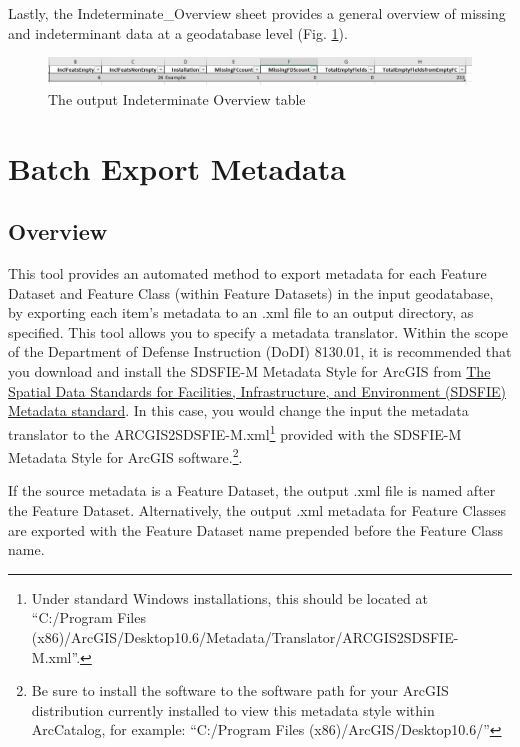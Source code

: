 \documentclass[openany]{book}
\let\rmarkdownfootnote\footnote%
\def\footnote{\protect\rmarkdownfootnote}
\theoremstyle{definition}
\theoremstyle{definition}
\theoremstyle{definition}
\theoremstyle{remark}
\begin{document}
Lastly, the Indeterminate\_Overview sheet provides a general overview of
missing and indeterminant data at a geodatabase level (Fig.
\ref{fig:summIndtsheet4}).

\begin{figure}[H]

{\centering \includegraphics{figures/summIndt-sheet4} 

}

\caption{The output Indeterminate Overview table}\label{fig:summIndtsheet4}
\end{figure}

\hypertarget{exMeta}{\chapter{Batch Export Metadata}\label{exMeta}}

\section{Overview}\label{overview-10}

This tool provides an automated method to export metadata for each
Feature Dataset and Feature Class (within Feature Datasets) in the input
geodatabase, by exporting each item's metadata to an .xml file to an
output directory, as specified. This tool allows you to specify a
metadata translator. Within the scope of the Department of Defense
Instruction (DoDI) 8130.01, it is recommended that you download and
install the SDSFIE-M Metadata Style for ArcGIS from
\href{https://www.sdsfieonline.org/Standards/Metadata}{The Spatial Data
Standards for Facilities, Infrastructure, and Environment (SDSFIE)
Metadata standard}. In this case, you would change the input the
metadata translator to the ARCGIS2SDSFIE-M.xml\footnote{Under standard
  Windows installations, this should be located at ``C:/Program Files
  (x86)/ArcGIS/Desktop10.6/Metadata/Translator/ARCGIS2SDSFIE-M.xml''.}
provided with the SDSFIE-M Metadata Style for ArcGIS software.\footnote{Be
  sure to install the software to the software path for your ArcGIS
  distribution currently installed to view this metadata style within
  ArcCatalog, for example: ``C:/Program Files
  (x86)/ArcGIS/Desktop10.6/''}.

If the source metadata is a Feature Dataset, the output .xml file is
named after the Feature Dataset. Alternatively, the output .xml metadata
for Feature Classes are exported with the Feature Dataset name prepended
before the Feature Class name.
\end{document}
